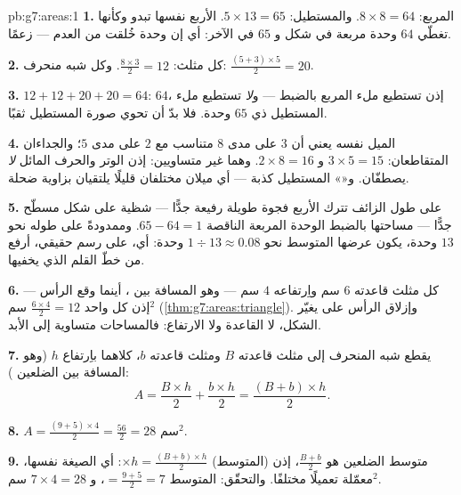 \begin{solution}{pb:g7:areas:1}
\textbf{1.} المربع: $8 \times 8 = 64$. والمستطيل:
$5 \times 13 = 65$.  الأربع نفسها تبدو وكأنها تغطّي $64$
وحدة مربعة في شكل و $65$ في الآخر: أي إن وحدة
 خُلقت من العدم --- زعمًا.

\textbf{2.} كل مثلث: $\frac{8 \times 3}{2} = 12$. وكل
شبه منحرف: $\frac{(5 + 3) \times 5}{2} = 20$.

\textbf{3.} $12 + 12 + 20 + 20 = 64$:   $64$،
إذن تستطيع ملء المربع بالضبط --- و\emph{لا} تستطيع ملء
المستطيل ذي $65$ وحدة. فلا بدّ أن تحوي صورة المستطيل
ثقبًا.

\textbf{4.} الميل نفسه يعني أن $3$ على مدى $8$
متناسب مع $2$ على مدى $5$؛ والجداءان المتقاطعان:
$3 \times 5 = 15$ و $2 \times 8 = 16$. وهما غير متساويين: إذن
الوتر والحرف المائل \emph{لا} يصطفّان. و«»
المستطيل كذبة --- أي ميلان مختلفان قليلًا يلتقيان بزاوية ضحلة.

\textbf{5.} على طول  الزائف تترك  الأربع
فجوة طويلة رفيعة جدًّا --- شظية على شكل 
مسطّح جدًّا --- مساحتها بالضبط الوحدة المربعة الناقصة
$65 - 64 = 1$. وممدودةً على  طوله نحو
$13$ وحدة، يكون عرضها المتوسط نحو
$1 \div 13 \approx 0.08$ وحدة: أي، على رسم حقيقي، أرفع من
خطّ القلم الذي يخفيها.

\textbf{6.} كل مثلث قاعدته $6$ سم واِرتفاعه $4$ سم ---
وهو المسافة بين ، أينما وقع الرأس ---
إذن  كل واحد $\frac{6 \times 4}{2} = 12$ سم$^2$
(\cref{thm:g7:areas:triangle}). وإزلاق الرأس على
 يغيّر الشكل، لا القاعدة ولا الارتفاع:
فالمساحات متساوية إلى الأبد.

\textbf{7.}  يقطع شبه المنحرف إلى مثلث
قاعدته $B$ ومثلث قاعدته $b$، كلاهما باِرتفاع $h$ (وهو
المسافة بين الضلعين ):
\[
A = \frac{B \times h}{2} + \frac{b \times h}{2}
= \frac{(B + b) \times h}{2} .
\]

\textbf{8.} $A = \frac{(9 + 5) \times 4}{2} = \frac{56}{2} =
28$ سم$^2$.

\textbf{9.} متوسط الضلعين  هو
$\frac{B + b}{2}$، إذن (المتوسط) $\times h =
\frac{(B+b) \times h}{2}$: أي الصيغة نفسها، معمّلة
تعميلًا مختلفًا. والتحقّق: المتوسط $= \frac{9+5}{2} = 7$، و
$7 \times 4 = 28$ سم$^2$.


\end{solution}
